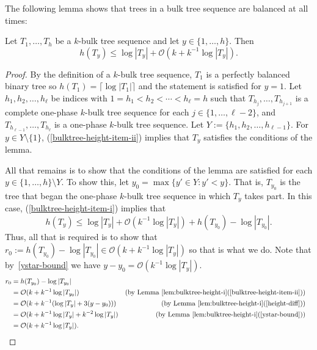 \documentclass[kpfonts]{patmorin}
\newcommand{\Oh}{\mathcal{O}}
\let\le\leqslant
\begin{document}
The following lemma shows that trees in a bulk tree sequence are balanced at all times:

\begin{lem}
  Let $T_1,\ldots,T_h$ be a $k$-bulk tree sequence and let $y\in\{1,\ldots,h\}$.
  Then
\[
h(T_y)\le \log|T_y| + \Oh(k+k^{-1}\log|T_y|).
\]
\end{lem}

\begin{proof}
  By the definition of a $k$-bulk tree sequence, $T_1$ is a perfectly balanced binary tree so $h(T_1)=\lceil\log|T_1|\rceil$ and the statement is satisfied for $y=1$.
  Let $h_1,h_2,\ldots,h_{\ell}$ be indices with $1=h_1 < h_2 < \cdots <h_{\ell} = h$ such that $T_{h_j},\ldots,T_{h_{j+1}}$ is a complete one-phase $k$-bulk tree sequence for each $j\in\{1,\ldots,\ell-2\}$, and $T_{h_{\ell-1}},\ldots,T_{h_{\ell}}$ is a one-phase $k$-bulk tree sequence.
  Let $Y:= \{h_1,h_2,\ldots,h_{\ell-1}\}$.
  For $y\in Y\setminus\{1\}$,
  (\ref{bulktree-height-item-ii}) implies that $T_y$ satisfies the conditions of the lemma.

  All that remains is to show that the conditions of the lemma are satisfied for each $y\in\{1,\ldots,h\}\setminus Y$. To show this, let $y_0=\max\{ y'\in Y: y'<y\}$.  That is, $T_{y_0}$ is the tree that began the one-phase $k$-bulk tree sequence in which $T_y$ takes part.
  In this case, (\ref{bulktree-height-item-i}) implies that
  \[  h(T_y) \le \log |T_y| + \Oh(k^{-1}\log |T_y|) + h(T_{y_0})-\log|T_{y_0}|.\]
  Thus, all that is required is to show that $r_0:=h(T_{y_0})-\log|T_{y_0}|\in \Oh(k+k^{-1}\log|T_y|)$ so that is what we do.
  Note that by~\ref{ystar-bound}
  we have $y-y_0 = \Oh(k^{-1}\log|T_y|)$.
  \begin{align*}
    r_0 &= h(T_{y_0})-\log|T_{y_0}| \\
       &= \Oh(k + k^{-1}\log|T_{y_0}|)
        & \text{(by \lemref{bulktree-height-i}(\ref{bulktree-height-item-ii}))}\\
       &= \Oh(k + k^{-1}(\log|T_{y}| + 3(y-y_0)))
        & \text{(by \lemref{bulktree-height-i}(\ref{height-diff}))} \\
       &= \Oh(k + k^{-1}\log|T_{y}| + k^{-2}\log|T_{y}|) & \text{(by \lemref{bulktree-height-i}(\ref{ystar-bound}))} \\
       &= \Oh(k + k^{-1}\log|T_{y}|).  &  & \qedhere
  \end{align*}
\end{proof}
\end{document}
